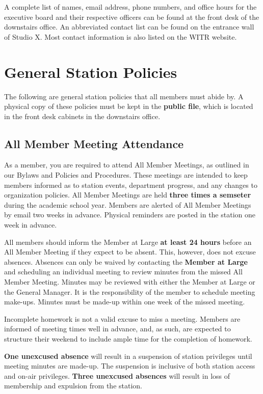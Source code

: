 \documentclass{witrman}
\begin{document}
A complete list of names, email address, phone numbers, and office hours for the
executive board and their respective officers can be found at the front desk of
the downstairs office.  An abbreviated contact list can be found on the entrance
wall of Studio X.  Most contact information is also listed on the WITR website.

\chapter{General Station Policies}

The following are general station policies that all members must abide by. A
physical copy of these policies must be kept in the \textbf{public file}, which
is located in the front desk cabinets in the downstairs office.

\section{All Member Meeting Attendance}
As a member, you are required to attend All Member Meetings, as outlined in our
Bylaws and Policies and Procedures.  These meetings are intended to keep members
informed as to station events, department progress, and any changes to
organization policies.  All Member Meetings are held \textbf{three times a
semseter} during the academic school year. Members are alerted of All Member
Meetings by email two weeks in advance. Physical reminders are posted in the
station one week in advance.

All members should inform the Member at Large \textbf{at least 24 hours} before
an All Member Meeting if they expect to be absent.  This, however, does not
excuse absences.  Absences can only be waived by contacting the \textbf{Member
at Large} and scheduling an individual meeting to review minutes from the missed
All Member Meeting.  Minutes may be reviewed with either the Member at Large or
the General Manager.  It is the responsibility of the member to schedule meeting
make-ups.  Minutes must be made-up within one week of the missed meeting.

Incomplete homework is not a valid excuse to miss a meeting. Members are
informed of meeting times well in advance, and, as such, are expected to
structure their weekend to include ample time for the completion of homework.

\textbf{One unexcused absence} will result in a suspension of station privileges
until meeting minutes are made-up.  The suspension is inclusive of both station
access and on-air privileges.  \textbf{Three unexcused absences} will result in
loss of membership and expulsion from the station.
\end{document}

